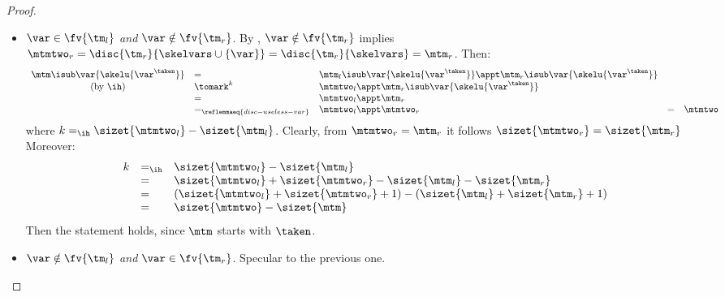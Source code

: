 \begin{proof}
\begin{itemize}
\begin{itemize}
\begin{itemize}
\item \emph{$\var \in \fv{\tm_l}$ and $\var\notin\fv{\tm_r}$}. By , $\var \notin \fv{\tm_r}$ implies $\mtmtwo_r=\disc{\tm_r}{\skelvars \cup \{\var\}} = \disc{\tm_r}{\skelvars} = \mtm_r$.
Then:
\[\begin{array}{cllllll}
\mtm\isub\var{\skelu{\var^\taken}}
  &= & 
  \mtm_l\isub\var{\skelu{\var^\taken}}\appt\mtm_r\isub\var{\skelu{\var^\taken}} 
  \\
   \mbox{(by \ih)}  &\tomark^{k} &
\mtmtwo_l\appt \mtm_r\isub\var{\skelu{\var^\taken}} 
  \\
 &= &
  \mtmtwo_l \appt \mtm_r
  \\
 &=_{\reflemmaeq{disc-useless-var}} &
  \mtmtwo_l \appt \mtmtwo_r
  &=&
  \mtmtwo
\end{array}\]
where $k =_{\ih} \sizet{\mtmtwo_l} - \sizet{\mtm_l}$. Clearly, from $\mtmtwo_r= \mtm_r$ it follows $\sizet{\mtmtwo_r}= \sizet{\mtm_r}$
Moreover:
\[\begin{array}{lllllll}
k & =_{\ih} & 
\sizet{\mtmtwo_l} - \sizet{\mtm_l} 
\\
& = & 
\sizet{\mtmtwo_l} +\sizet{\mtmtwo_r} - \sizet{\mtm_l} - \sizet{\mtm_r}
\\
& = & 
(\sizet{\mtmtwo_l} +\sizet{\mtmtwo_r}+1) - (\sizet{\mtm_l} + \sizet{\mtm_r}+1)
\\
& = & 
\sizet{\mtmtwo} - \sizet{\mtm}
\end{array}\]
Then the statement holds, since $\mtm$ starts with $\taken$.


\item \emph{$\var \notin \fv{\tm_l}$ and $\var\in\fv{\tm_r}$}. Specular to the previous one.
\end{itemize}



\end{itemize}
\end{itemize}
\end{proof}
